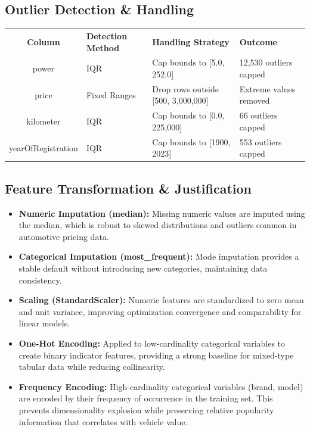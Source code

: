 \documentclass[12pt, a4paper]{article}
\begin{document}
\subsection{Outlier Detection \& Handling}
\begin{center}
\renewcommand{\arraystretch}{1.4}
\begin{tabular}{c l l l}
  \rowcolor{slate}
  {\color{white}\small\bfseries Column} &
  {\color{white}\small\bfseries Detection Method} &
  {\color{white}\small\bfseries Handling Strategy} &
  {\color{white}\small\bfseries Outcome} \\
  \rowcolor{lightgray} power & IQR & Cap bounds to [5.0, 252.0] & 12,530 outliers capped \\
  \rowcolor{white} price & Fixed Ranges & Drop rows outside [500, 3,000,000] & Extreme values removed \\
  \rowcolor{lightgray} kilometer & IQR & Cap bounds to [0.0, 225,000] & 66 outliers capped \\
  \rowcolor{white} yearOfRegistration & IQR & Cap bounds to [1900, 2023] & 553 outliers capped \\
\end{tabular}
\end{center}

\newpage
\subsection{Feature Transformation \& Justification}

\begin{itemize}
  \item \textbf{Numeric Imputation (median):} Missing numeric values are imputed using the median, which is robust to skewed distributions and outliers common in automotive pricing data.
  \item \textbf{Categorical Imputation (most\_frequent):} Mode imputation provides a stable default without introducing new categories, maintaining data consistency.
  \item \textbf{Scaling (StandardScaler):} Numeric features are standardized to zero mean and unit variance, improving optimization convergence and comparability for linear models.
  \item \textbf{One-Hot Encoding:} Applied to low-cardinality categorical variables to create binary indicator features, providing a strong baseline for mixed-type tabular data while reducing collinearity.
  \item \textbf{Frequency Encoding:} High-cardinality categorical variables (brand, model) are encoded by their frequency of occurrence in the training set. This prevents dimensionality explosion while preserving relative popularity information that correlates with vehicle value.
\end{itemize}
\end{document}
